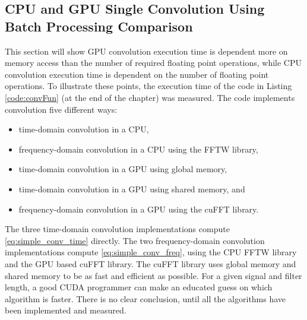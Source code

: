 \subsection{CPU and GPU Single Convolution Using Batch Processing Comparison}
\label{sec:cuda_convolution_single}
This section will show GPU convolution execution time is dependent more on memory access than the number of required floating point operations, while CPU convolution execution time is dependent on the number of floating point operations.
To illustrate these points, the execution time of the code in Listing \ref{code:convFun} (at the end of the chapter) was measured.
The code implements convolution five different ways:
\begin{itemize}
  \item time-domain convolution in a CPU,
  \item frequency-domain convolution in a CPU using the FFTW library,
  \item time-domain convolution in a GPU using global memory,
  \item time-domain convolution in a GPU using shared memory, and
  \item frequency-domain convolution in a GPU using the cuFFT library.
\end{itemize}

The three time-domain convolution implementations compute \eqref{eq:simple_conv_time} directly.
The two \newline frequency-domain convolution implementations compute \eqref{eq:simple_conv_freq}, using the CPU FFTW library and the GPU based cuFFT library.
The cuFFT library uses global memory and shared memory to be as fast and efficient as possible.
For a given signal and filter length, a good CUDA programmer can make an educated guess on which algorithm is faster.
There is no clear conclusion, until all the algorithms have been implemented and measured.

